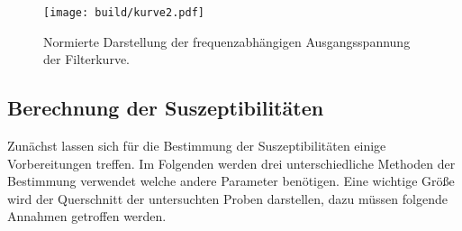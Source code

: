 \begin{figure}
    \centering
    \texttt{[image: build/kurve2.pdf]}
    \caption{Normierte Darstellung der frequenzabhängigen Ausgangsspannung der Filterkurve.} 
    \label{fig:kurve2}
\end{figure}

\subsection{Berechnung der Suszeptibilitäten}
 
Zunächst lassen sich für die Bestimmung der Suszeptibilitäten einige Vorbereitungen treffen. Im Folgenden werden drei unterschiedliche Methoden der Bestimmung verwendet welche andere Parameter benötigen.
Eine wichtige Größe wird der Querschnitt der untersuchten Proben darstellen, dazu müssen folgende Annahmen getroffen werden.


